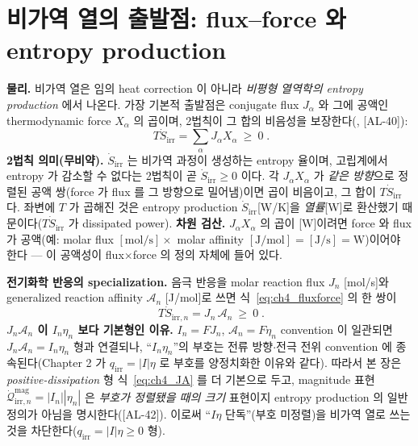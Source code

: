 \documentclass[11pt,a4paper]{article}
\newcommand{\irr}{\mathrm{irr}}
\newcommand{\AL}[1]{\textsf{[AL-#1]}}
\begin{document}
\section{비가역 열의 출발점: flux--force 와 entropy production}\label{sec:ch4_irr}
\textbf{물리.} 비가역 열은 임의 heat correction 이 아니라 \emph{비평형 열역학의 entropy production} 에서 나온다.
가장 기본적 출발점은 conjugate flux $J_\alpha$ 와 그에 공액인 thermodynamic force $X_\alpha$ 의 곱이며, 2법칙이
그 합의 비음성을 보장한다(\cite{degrootmazur1962,onsager1931,prigogine1967}, \AL{40}):
\begin{equation}
\boxed{\;T\dot S_{\irr}=\sum_\alpha J_\alpha X_\alpha\ \ge\ 0\;.}
\label{eq:ch4_fluxforce}
\end{equation}
\textbf{2법칙 의미(무비약).} $\dot S_\irr$ 는 비가역 과정이 생성하는 entropy 율이며, 고립계에서 entropy 가
감소할 수 없다는 2법칙이 곧 $\dot S_\irr\ge0$ 이다. 각 $J_\alpha X_\alpha$ 가 \emph{같은 방향}으로 정렬된
공액 쌍(force 가 flux 를 그 방향으로 밀어냄)이면 곱이 비음이고, 그 합이 $T\dot S_\irr$ 다. 좌변에 $T$ 가 곱해진
것은 entropy production $\dot S_\irr$[W/K]을 \emph{열률}[W]로 환산했기 때문이다($T\dot S_\irr$ 가 dissipated
power). \textbf{차원 검산.} $J_\alpha X_\alpha$ 의 곱이 [W]이려면 force 와 flux 가 공액(예: molar flux
$[\mathrm{mol/s}]\times$ molar affinity $[\mathrm{J/mol}]=[\mathrm{J/s}]=\mathrm W$)이어야 한다 — 이 공액성이
flux$\times$force 의 정의 자체에 들어 있다.

\textbf{전기화학 반응의 specialization.} 음극 반응을 molar reaction flux $J_n$ [mol/s]와 generalized reaction
affinity $\mathcal A_n$ [J/mol]로 쓰면 식~\eqref{eq:ch4_fluxforce} 의 한 쌍이
\begin{equation}
\boxed{\;T\dot S_{\irr,n}=J_n\,\mathcal A_n\ \ge\ 0\;.}
\label{eq:ch4_JA}
\end{equation}
\textbf{$J_n\mathcal A_n$ 이 $I_n\eta_n$ 보다 기본형인 이유.} $I_n=FJ_n$, $\mathcal A_n=F\eta_n$ convention 이
일관되면 $J_n\mathcal A_n=I_n\eta_n$ 형과 연결되나, ``$I_n\eta_n$''의 부호는 전류 방향$\cdot$전극 전위
convention 에 종속된다(Chapter 2 가 $q_\irr=|I|\eta$ 로 부호를 양정치화한 이유와 같다). 따라서 본 장은
\emph{positive-dissipation} 형 식~\eqref{eq:ch4_JA} 를 더 기본으로 두고, magnitude 표현
$\dot{\mathcal Q}_{\irr,n}^{\mathrm{mag}}=|I_n||\eta_n|$ 은 \emph{부호가 정렬됐을 때의 크기} 표현이지 entropy
production 의 일반 정의가 아님을 명시한다(\AL{42}). 이로써 ``$I\eta$ 단독''(부호 미정렬)을 비가역 열로 쓰는
것을 차단한다($q_\irr=|I|\eta\ge0$ 형).
\end{document}
